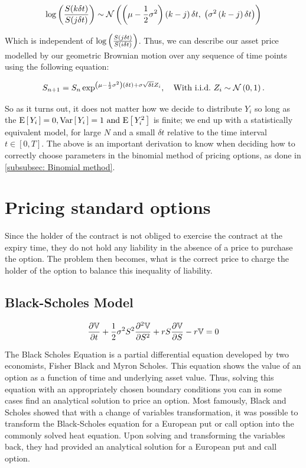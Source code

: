 \begin{equation*}
    \log\left(\frac{S(k\delta t)}{S(j\delta t)}\right) \sim \mathcal{N}\left(\left(\mu - \frac{1}{2}\sigma^2\right)\left(k-j\right)\delta t,\;\left(\sigma^2\left(k-j\right)\delta t\right)\right)
\end{equation*}

Which is independent of \(\log\left(\frac{S(j\delta t)}{S(i\delta t)}\right)\).
\nline{}
Thus, we can describe our asset price modelled by our geometric Brownian motion over any sequence of time points using the following equation:

\begin{equation}\label{eqn:c1:geobrown model}
    S_{n+1} = S_n\exp^{\left(\mu-\frac{1}{2}\sigma^2\right)\left(\delta t\right) + \sigma\sqrt{\delta t}Z_i}, \quad \text{With i.i.d.~} Z_i \sim \mathcal{N}\left(0,1\right).
\end{equation}

So as it turns out, it does not matter how we decide to distribute \(Y_i\) so long as the \(\text{E}\left[\,Y_i\,\right] = 0, \text{Var}\left[\,Y_i\,\right] = 1 \text{ and } \text{E}\left[\,Y_i^2\,\right]\) is finite; we end up with a statistically equivalent model, for large \(N\) and a small \(\delta t\) relative to the time interval \(t\in[0,T]\). 
\nline{}
The above is an important derivation to know when deciding how to correctly choose parameters in the binomial method of pricing options, as done in \autoref{subsubsec: Binomial method}.

\section{Pricing standard options}

Since the holder of the contract is not obliged to exercise the contract at the expiry time, they do not hold any liability in the absence of a price to purchase the option. The problem then becomes, what is the correct price to charge the holder of the option to balance this inequality of liability.

\subsection{Black-Scholes Model}

\begin{equation}\label{eqn:BS}
    \frac{\partial \mathbb{V}}{\partial t} + \frac{1}{2}\sigma^2S^2\frac{\partial^2\mathbb{V}}{\partial S^2} + rS\frac{\partial \mathbb{V}}{\partial S} - r\mathbb{V} = 0
\end{equation}

The Black Scholes Equation is a partial differential equation developed by two economists, Fisher Black and Myron Scholes. This equation shows the value of an option as a function of time and underlying asset value. Thus, solving this equation with an appropriately chosen boundary conditions you can in some cases find an analytical solution to price an option. Most famously, Black and Scholes showed that with a change of variables transformation, it was possible to transform the Black-Scholes equation for a European put or call option into the commonly solved heat equation. Upon solving and transforming the variables back, they had provided an analytical solution for a European put and call option.

